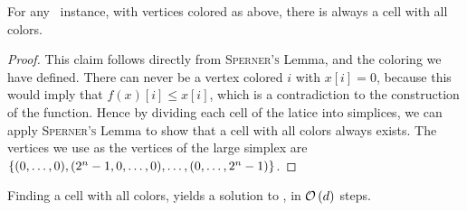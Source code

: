 \begin{claim}
    For any \Tarskistar\ instance, with vertices colored as above, there is always a cell with all colors.
\end{claim}
\begin{proof}
    This claim follows directly from \textsc{Sperner's} Lemma, and the coloring we have defined. There can never be a vertex colored $i$ with $x[i] = 0$, because this would imply that $f(x)[i] \leq x[i]$, which is a contradiction to the construction of the function. Hence by dividing each cell of the latice into simplices, we can apply \textsc{Sperner's} Lemma to show that a cell with all colors always exists. The vertices we use as the vertices of the large simplex are $\left\{(0, \dots, 0), (2^n - 1, 0, \dots, 0), \dots, (0, \dots, 2^n - 1)\right\}$.
\end{proof}
\begin{claim}
    Finding a cell with all colors, yields a solution to \Tarskistar, in $\mathcal{O}\left(d\right)$ steps.
\end{claim}
